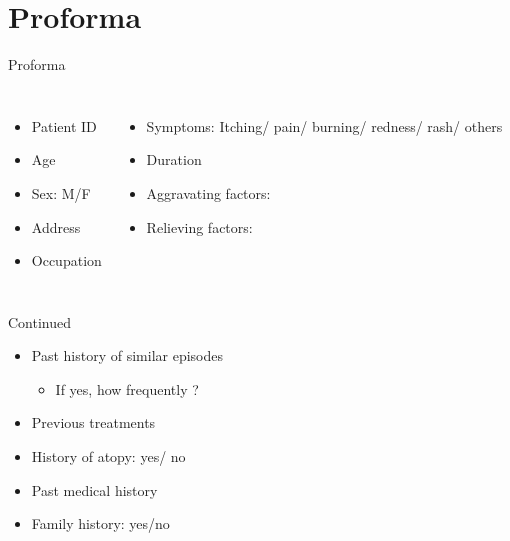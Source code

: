\documentclass[11pt]{beamer}
\begin{document}
\section{Proforma}
\begin{frame}{Proforma}
\begin{columns}
\begin{itemize}
\item Patient ID
\item Age										\item Sex: M/F
\item Address									\item Occupation	
\end{itemize}	

\begin{itemize}
\item Symptoms: Itching/ pain/ burning/ redness/ rash/ others
\item Duration
\item Aggravating factors:
\item Relieving factors:
\end{itemize}
\end{columns}
\end{frame}

\begin{frame}{Continued}
\begin{itemize}
\item Past history of similar episodes
\begin{itemize}
\item If yes, how frequently ?
\end{itemize}
\item Previous treatments
\item History of atopy:  yes/ no
\item Past medical history
\item Family history:  yes/no

\end{itemize}
\end{frame}
\end{document}

